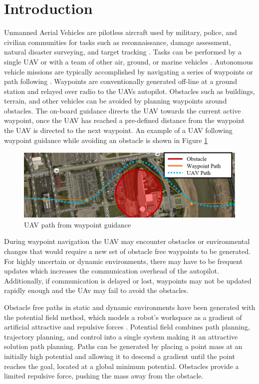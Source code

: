 \documentclass[conf]{new-aiaa}
\begin{document}
\section{Introduction}
Unmanned Aerial Vehicles are pilotless aircraft used by military, police, and civilian communities for tasks such as reconnaissance, damage assessment, natural disaster surveying, and target tracking \cite{ariyur_autonomous_2008,teuliere_chasing_2011}. Tasks can be performed by a single UAV or with a team of other air, ground, or marine vehicles \cite{oh_coordinated_2013,hyondong_oh_coordinated_2015,ulun_coordinated_2013}. Autonomous vehicle missions are typically accomplished by navigating a series of waypoints \cite{ariyur_autonomous_2008} or path following \cite{oliveira_moving_2016}. Waypoints are conventionally generated off-line at a ground station and relayed over radio to the UAVs autopilot. Obstacles such as buildings, terrain, and other vehicles can be avoided by planning waypoints around obstacles. The on-board guidance directs the UAV towards the current active waypoint, once the UAV has reached a pre-defined distance from the waypoint the UAV is directed to the next waypoint. An example of a UAV following waypoint guidance while avoiding an obstacle is shown in Figure \ref{fig:simplewaypointsWithUAVPath}


\begin{figure}[H]
	\centering
	\includegraphics[width=1\linewidth]{Figures/simpleWaypointsWithUAVPath}
	\caption{UAV path from waypoint guidance}
	\label{fig:simplewaypointsWithUAVPath}
\end{figure}


During waypoint navigation the UAV may encounter obstacles or environmental changes that would require a new set of obstacle free waypoints to be generated. For highly uncertain or dynamic environments, there may have to be frequent updates which increases the communication overhead of the autopilot. Additionally, if communication is delayed or lost, waypoints may not be updated rapidly enough and the UAv may fail to avoid the obstacles.


Obstacle free paths in static and dynamic environments have been generated with the potential field method, which models a robot's workspace as a gradient of artificial attractive and repulsive forces \cite{khatib_real-time_1986}. Potential field combines path planning, trajectory planning, and control into a single system \cite{rimon_exact_1992} making it an attractive solution path planning. Paths can be generated by placing a point mass at an initially high potential and allowing it to descend a gradient until the point reaches the goal, located at a global minimum potential. Obstacles provide a limited repulsive force, pushing the mass away from the obstacle. 
\end{document}
